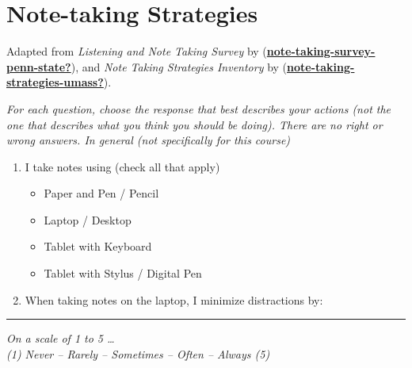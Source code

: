 \documentclass[letterpaper, nobind]{templates/ociamthesis}
\providecommand{\tightlist}{%
  \setlength{\itemsep}{0pt}\setlength{\parskip}{0pt}}
\begin{document}
\hypertarget{app-note-taking-strategies}{%
\section{Note-taking Strategies}\label{app-note-taking-strategies}}

Adapted from \emph{Listening and Note Taking Survey} by
(\protect\hyperlink{ref-note-taking-survey-penn-state}{\textbf{note-taking-survey-penn-state?}}), and \emph{Note Taking Strategies Inventory}
by (\protect\hyperlink{ref-note-taking-strategies-umass}{\textbf{note-taking-strategies-umass?}}).

\emph{For each question, choose the response that best describes your actions
(not the one that describes what you think you should be doing). There
are no right or wrong answers. In general (not specifically for this
course)}

\begin{enumerate}
\def\labelenumi{\arabic{enumi}.}
\tightlist
\item
  I take notes using (check all that apply)

  \begin{itemize}
  \tightlist
  \item
    Paper and Pen / Pencil
  \item
    Laptop / Desktop
  \item
    Tablet with Keyboard
  \item
    Tablet with Stylus / Digital Pen
  \end{itemize}
\item
  When taking notes on the laptop, I minimize distractions by:
\end{enumerate}

\begin{center}\rule{0.5\linewidth}{0.5pt}\end{center}

\emph{On a scale of 1 to 5 \ldots{}\\
(1) Never -- Rarely -- Sometimes -- Often -- Always (5)}
\end{document}
